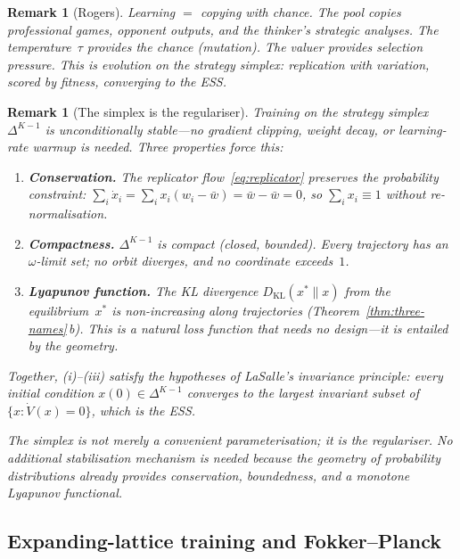\documentclass[11pt,a4paper]{article}
\newtheorem{remark}[theorem]{Remark}
\newcommand{\DKL}{D_{\mathrm{KL}}}
\begin{document}
\begin{remark}[Rogers]\label{rem:rogers}
Learning $=$ copying with chance.
The pool copies professional games, opponent outputs,
and the thinker's strategic analyses.
The temperature~$\tau$ provides the chance (mutation).
The valuer provides selection pressure.
This is evolution on the strategy simplex:
replication with variation, scored by fitness,
converging to the ESS.
\end{remark}

\begin{remark}[The simplex is the regulariser]%
\label{rem:simplex-stable}
Training on the strategy simplex $\Delta^{K-1}$ is
\emph{unconditionally stable}---no gradient clipping,
weight decay, or learning-rate warmup is needed.
Three properties force this:
\begin{enumerate}[nosep, label=\textup{(\roman*)}]
\item \textbf{Conservation.}
  The replicator flow~\eqref{eq:replicator}
  preserves the probability constraint:
  $\sum_i \dot{x}_i
    = \sum_i x_i(w_i - \bar{w})
    = \bar{w} - \bar{w} = 0$,
  so $\sum_i x_i \equiv 1$ without re-normalisation.
\item \textbf{Compactness.}
  $\Delta^{K-1}$ is compact (closed, bounded).
  Every trajectory has an $\omega$-limit set;
  no orbit diverges, and no coordinate exceeds~$1$.
\item \textbf{Lyapunov function.}
  The KL divergence $\DKL(x^* \| x)$
  from the equilibrium~$x^*$ is non-increasing
  along trajectories (Theorem~\ref{thm:three-names}\,b).
  This is a natural loss function that needs
  no design---it is entailed by the geometry.
\end{enumerate}
Together, (i)--(iii) satisfy the hypotheses of
LaSalle's invariance principle:
every initial condition $x(0) \in \Delta^{K-1}$
converges to the largest invariant subset of
$\{x : \dot{V}(x) = 0\}$, which is the ESS.

The simplex is not merely a convenient
parameterisation; it \emph{is} the regulariser.
No additional stabilisation mechanism is needed
because the geometry of probability distributions
already provides conservation, boundedness,
and a monotone Lyapunov functional.
\end{remark}

\subsection{Expanding-lattice training and Fokker--Planck}\label{sec:expanding}
\end{document}
